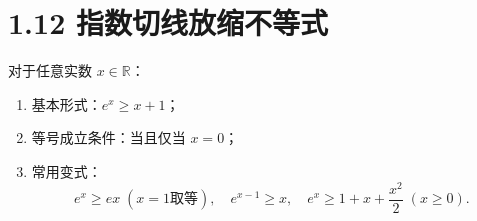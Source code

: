 \documentclass{article}
\begin{document}
\section*{1.12 指数切线放缩不等式}
对于任意实数 \( x \in \mathbb{R} \)：
\begin{enumerate}
    \item 基本形式：\( e^x \geq x+1 \)；
    \item 等号成立条件：当且仅当 \( x=0 \)；
    \item 常用变式：
    \[
    e^x \geq e x\;(x=1\text{取等}),\quad e^{x-1} \geq x,\quad e^x \geq 1+x+\frac{x^2}{2}\;(x\geq0).
    \]
\end{enumerate}
\end{document}
